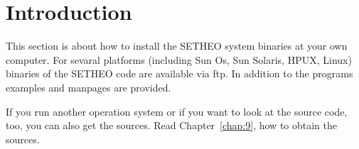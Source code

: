 %
\section{Introduction}

This section is about how to install the SETHEO system binaries at
your own  computer. For sevaral platforms (including Sun Os, Sun
Solaris, HPUX, Linux) binaries of the SETHEO code are available via
ftp. In addition to the programs examples and manpages are provided. 

If you run another operation system or if you want to look at the
source code, too, you can also get the sources. Read
Chapter~\ref{chap:9}, how to obtain the sources. 
